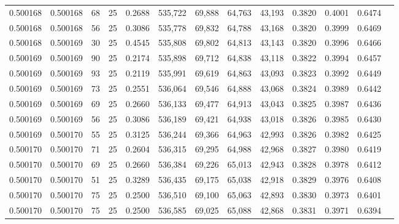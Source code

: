 \begin{tabular}{rrrrrrrrrrrrr}
0.500168 & 0.500168 &    68 &  25 &                                     0.2688 & 535,722 &  69,888 &  64,763 &  43,193 & 0.3820 & 0.4001 & 0.6474 \\
0.500168 & 0.500168 &    56 &  25 &                                     0.3086 & 535,778 &  69,832 &  64,788 &  43,168 & 0.3820 & 0.3999 & 0.6469 \\
0.500168 & 0.500169 &    30 &  25 &                                     0.4545 & 535,808 &  69,802 &  64,813 &  43,143 & 0.3820 & 0.3996 & 0.6466 \\
0.500169 & 0.500169 &    90 &  25 &                                     0.2174 & 535,898 &  69,712 &  64,838 &  43,118 & 0.3822 & 0.3994 & 0.6457 \\
0.500169 & 0.500169 &    93 &  25 &                                     0.2119 & 535,991 &  69,619 &  64,863 &  43,093 & 0.3823 & 0.3992 & 0.6449 \\
0.500169 & 0.500169 &    73 &  25 &                                     0.2551 & 536,064 &  69,546 &  64,888 &  43,068 & 0.3824 & 0.3989 & 0.6442 \\
0.500169 & 0.500169 &    69 &  25 &                                     0.2660 & 536,133 &  69,477 &  64,913 &  43,043 & 0.3825 & 0.3987 & 0.6436 \\
0.500169 & 0.500169 &    56 &  25 &                                     0.3086 & 536,189 &  69,421 &  64,938 &  43,018 & 0.3826 & 0.3985 & 0.6430 \\
0.500169 & 0.500170 &    55 &  25 &                                     0.3125 & 536,244 &  69,366 &  64,963 &  42,993 & 0.3826 & 0.3982 & 0.6425 \\
0.500170 & 0.500170 &    71 &  25 &                                     0.2604 & 536,315 &  69,295 &  64,988 &  42,968 & 0.3827 & 0.3980 & 0.6419 \\
0.500170 & 0.500170 &    69 &  25 &                                     0.2660 & 536,384 &  69,226 &  65,013 &  42,943 & 0.3828 & 0.3978 & 0.6412 \\
0.500170 & 0.500170 &    51 &  25 &                                     0.3289 & 536,435 &  69,175 &  65,038 &  42,918 & 0.3829 & 0.3976 & 0.6408 \\
0.500170 & 0.500170 &    75 &  25 &                                     0.2500 & 536,510 &  69,100 &  65,063 &  42,893 & 0.3830 & 0.3973 & 0.6401 \\
0.500170 & 0.500170 &    75 &  25 &                                     0.2500 & 536,585 &  69,025 &  65,088 &  42,868 & 0.3831 & 0.3971 & 0.6394 \\

\end{tabular}
